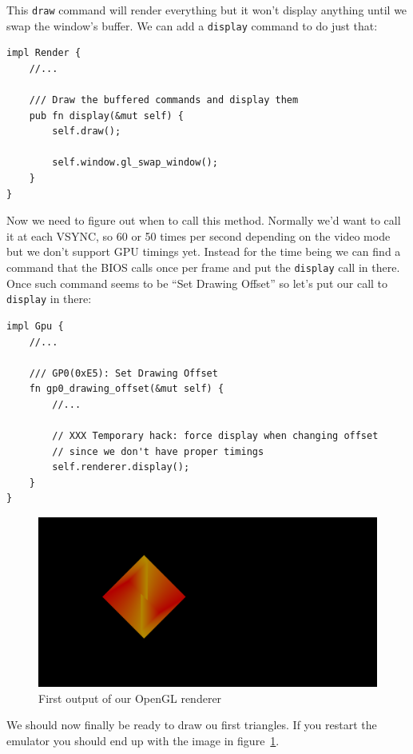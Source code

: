 \documentclass[a4paper]{article}
\newcommand{\code}[1] {\texttt{#1}}
\begin{document}
This \code{draw} command will render everything but it won't display
anything until we swap the window's buffer. We can add a
\code{display} command to do just that:

\begin{lstlisting}
impl Render {
    //...

    /// Draw the buffered commands and display them
    pub fn display(&mut self) {
        self.draw();

        self.window.gl_swap_window();
    }
}
\end{lstlisting}

Now we need to figure out when to call this method. Normally we'd want
to call it at each VSYNC, so 60 or 50 times per second depending on
the video mode but we don't support GPU timings yet. Instead for the
time being we can find a command that the BIOS calls once per frame
and put the \code{display} call in there. Once such command seems to
be ``Set Drawing Offset'' so let's put our call to \code{display} in
there:

\begin{lstlisting}
impl Gpu {
    //...

    /// GP0(0xE5): Set Drawing Offset
    fn gp0_drawing_offset(&mut self) {
        //...

        // XXX Temporary hack: force display when changing offset
        // since we don't have proper timings
        self.renderer.display();
    }
}
\end{lstlisting}

\begin{figure}[ht]
  \centering
  \includegraphics[width=\textwidth]{images/first-triangles}
  \caption{First output of our OpenGL renderer}
  \label{fig:renderer_first_triangles}
\end{figure}

We should now finally be ready to draw ou first triangles. If you
restart the emulator you should end up with the image in
figure~\ref{fig:renderer_first_triangles}.
\end{document}
